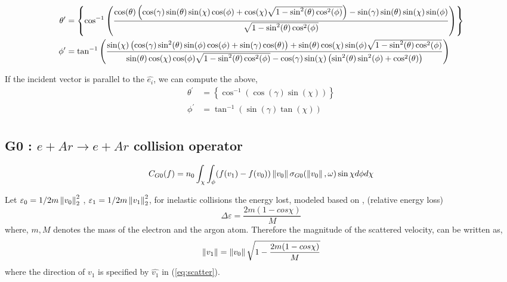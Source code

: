 \documentclass{article}
\begin{document}
\begin{align}
    \theta^\prime &= \tiny \left\{\cos ^{-1}\left(\frac{\cos (\theta ) \left(\cos (\gamma ) \sin (\theta ) \sin (\chi ) \cos (\phi )+\cos (\chi ) \sqrt{1-\sin ^2(\theta ) \cos ^2(\phi )}\right)-\sin (\gamma ) \sin (\theta ) \sin (\chi ) \sin (\phi )}{\sqrt{1-\sin ^2(\theta ) \cos ^2(\phi )}}\right)\right\} \\
    \phi^\prime &= \tan ^{-1}\left(\frac{\sin (\chi ) \left(\cos (\gamma ) \sin ^2(\theta ) \sin (\phi ) \cos (\phi )+\sin (\gamma ) \cos (\theta )\right)+\sin (\theta ) \cos (\chi ) \sin (\phi ) \sqrt{1-\sin ^2(\theta ) \cos ^2(\phi )}}{\sin (\theta ) \cos (\chi ) \cos (\phi ) \sqrt{1-\sin ^2(\theta ) \cos ^2(\phi )}-\cos (\gamma ) \sin (\chi ) \left(\sin ^2(\theta ) \sin ^2(\phi )+\cos ^2(\theta )\right)}\right)
\end{align}

If the incident vector is parallel to the $\hat{e_i}$, we can compute the above, 
\begin{align}
    \theta^\prime &=\left\{\cos ^{-1}(\cos (\gamma ) \sin (\chi ))\right\} \\
    \phi^\prime &=\tan ^{-1}(\sin (\gamma ) \tan (\chi )) \\
\end{align}




\subsection{G0 : $e + Ar \rightarrow e + Ar$ collision operator}
\begin{equation}
    C_{G0}(f) = n_0 \int_{\chi} \int_{\phi} (f(v_1) - f(v_0)) \left\lVert v_0\right\rVert \sigma_{G0}(\left\lVert v_0\right\rVert,\omega) \sin\chi d\phi d\chi
\end{equation}

Let $\varepsilon_0 = 1/2 m \left\lVert v_0\right\rVert^2_2$ , $\varepsilon_1 = 1/2 m \left\lVert v_1\right\rVert^2_2$, for inelastic collisions the energy lost, modeled based on \cite{vahedi1995monte}, (relative energy loss)
\begin{equation}
    \Delta \varepsilon = \frac{2m(1-cos\chi)}{M}
\end{equation} where, $m,M$ denotes the mass of the electron and the argon atom. Therefore the magnitude of the scattered velocity, can be written as, 
\begin{equation}
    \left\lVert v_1\right\rVert = \left\lVert v_0\right\rVert \sqrt{1- \frac{2m(1-cos\chi)}{M}} \label{eq:g0_eloss}
\end{equation} where the direction of $v_1$ is specified by $\hat{v_1}$ in (\ref{eq:scatter}).
\end{document}
